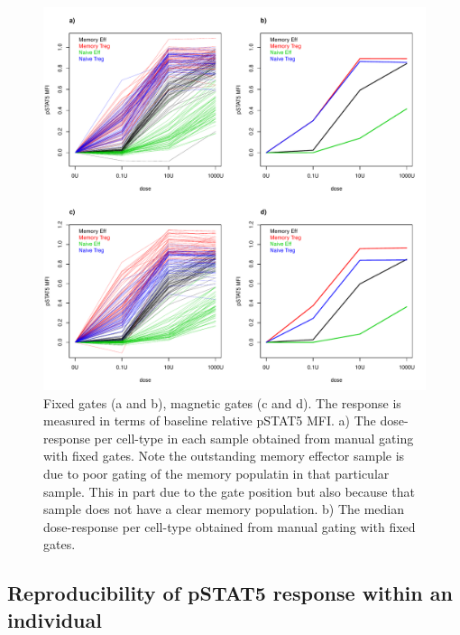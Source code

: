 \hspace{-2cm}
\begin{figure}[h]
\centering
\includegraphics[scale=.5]{IL2/figures/pstat5-response-cellsubsets-manualgates.pdf}
\caption{ \label{figure:pstat5-response-cellsubsets-gate}
Fixed gates (a and b), magnetic gates (c and d).
The response is measured in terms of baseline relative pSTAT5 MFI.
a) The dose-response per cell-type in each sample obtained from manual gating with fixed gates.
Note the outstanding memory effector sample is due to poor gating of the memory populatin in that particular sample.
This in part due to the gate position but also because that sample does not have a clear memory population.
b) The median dose-response per cell-type obtained from manual gating with fixed gates.
}
\end{figure}


\subsection{Reproducibility of pSTAT5 response within an individual}

